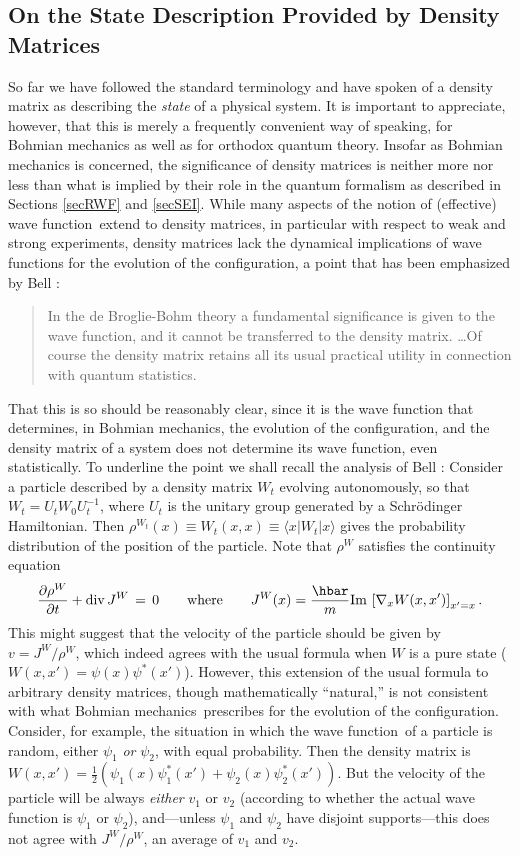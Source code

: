 \documentclass[12pt]{article}
\newcommand{\Sc}{Schr\"{o}dinger}
\newcommand{\BM}{Bohmian mechanics}
\newcommand{\wf}{wave function}
\newcommand{\oqt}{orthodox quantum theory}
\begin{document}
\subsection {On the State Description Provided by Density Matrices} So
far we have followed the standard terminology and have spoken of a
density matrix as describing the {\it state} of a physical system.  It
is important to appreciate, however, that this is merely a frequently
convenient way of speaking, for \BM{} as well as for \oqt{}.  Insofar
as \BM{} is concerned, the significance of density matrices is neither
more nor less than what is implied by their role in the quantum
formalism as described in Sections \ref{secRWF} and \ref{secSEI}.
While many aspects of the notion of (effective) \wf\ extend to density
matrices, in particular with respect to weak and strong experiments,
density matrices lack the dynamical implications of \wf{}s for the
evolution of the configuration, a point that has been emphasized by
Bell \cite{Bel80}:
\begin{quotation}\setlength{\baselineskip}{12pt}\noindent
   In the de Broglie-Bohm theory a fundamental significance is given to
   the wave function, and it cannot be transferred to the density
   matrix.  \ldots Of course the density matrix retains all its usual
   practical utility in connection with quantum statistics.
\end{quotation}
That this is so should be reasonably clear, since it is the \wf{} that
determines, in \BM{}, the evolution of the configuration, and the
density matrix of a system does not determine its \wf{}, even
statistically. To underline the point we shall recall the analysis of
Bell \cite{Bel80}: Consider a particle described by a density matrix
$W_t$ evolving autonomously, so that $W_{t} =U_{t}W_{0}U_{t}^{-1}$,
where $U_{t}$ is the unitary group generated by a \Sc{} Hamiltonian.
Then $ \rho^{W_{t}}(x) \equiv W_{t}(x,x)\equiv \langle x| W_{t}|
x\rangle $ gives the probability distribution of the position of the
particle.  Note that $\rho^{W}$ satisfies the continuity equation
$$
\frac{\partial \rho^W}{\partial t} + \hbox{\rm div}\, J^W
\,=\,0\qquad\mbox{where}\qquad J^{W} (x) = \frac{\hbar}{m}{\rm Im}\,
\left[ \nabla_x W(x,x')\right]_{x'=x}.
$$
This might suggest that the velocity of the particle should be
given by $ v =J^W /\rho^W $, which indeed agrees with the usual
formula when $W$ is a pure state ($W(x,x') = \psi (x) \psi^*(x')$).
However, this extension of the usual formula to arbitrary density
matrices, though mathematically ``natural,'' is not consistent with
what \BM\ prescribes for the evolution of the configuration. Consider,
for example, the situation in which the \wf\ of a particle is random,
either $\psi_1$ {\it or } $\psi_2$, with equal probability.  Then the
density matrix is $ W(x,x') = \frac12\left( \psi_1(x) \psi_1^* (x')+
   \psi_2(x)\psi_2^*(x')\right) $. But the velocity of the particle
will be always {\it either} $v_1$ or $v_2$ (according to whether the
actual \wf{} is $\psi_1$ or $\psi_2$), and---unless $\psi_1$ and
$\psi_2$ have disjoint supports---this does not agree with $J^W /
\rho^W $, an average of $v_1$ and $v_2$.
\end{document}
